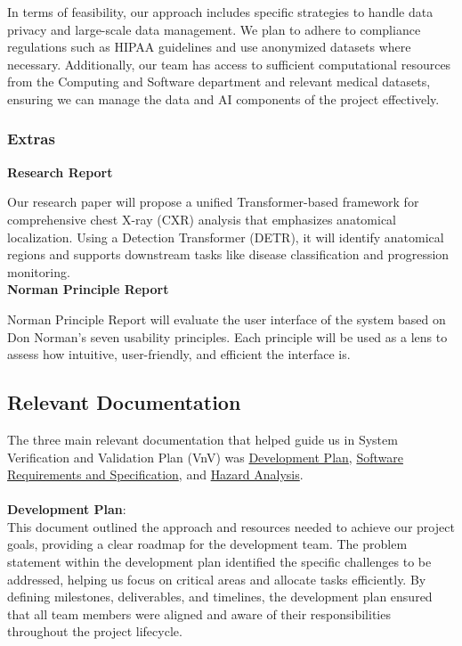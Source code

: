 \documentclass[12pt, titlepage]{article}
\begin{document}
\noindent In terms of feasibility, our approach includes specific strategies to handle data privacy and large-scale data management. We plan to adhere to compliance regulations such as HIPAA guidelines and use anonymized datasets where necessary. Additionally, our team has access to sufficient computational resources from the Computing and Software department and relevant medical datasets, ensuring we can manage the data and AI components of the project effectively.

\subsubsection{Extras}

\noindent \textbf{Research Report}

\noindent Our research paper will propose a unified Transformer-based framework for comprehensive chest X-ray (CXR) analysis that emphasizes anatomical localization. Using a Detection Transformer (DETR), it will identify anatomical regions and supports downstream tasks like disease classification and progression monitoring. \\

\noindent \textbf{Norman Principle Report}

\noindent Norman Principle Report will evaluate the user interface of the system based on Don Norman's seven usability principles. Each principle will be used as a lens to assess how intuitive, user-friendly, and efficient the interface is.\\

\subsection{Relevant Documentation}

The three main relevant documentation that helped guide us in System Verification and Validation Plan (VnV) was \href{https://github.com/RezaJodeiri/CXR-Capstone/blob/main/docs/DevelopmentPlan/DevelopmentPlan.pdf}{Development Plan}, \href{https://github.com/RezaJodeiri/CXR-Capstone/blob/main/docs/SRS/SRS.pdf}{Software Requirements and Specification}, and 
\href{https://github.com/RezaJodeiri/CXR-Capstone/blob/main/docs/HazardAnalysis/HazardAnalysis.pdf}{Hazard Analysis}.
\\\\
\textbf{Development Plan}:\\

\noindent This document outlined the approach and resources needed to achieve our project goals, providing a clear roadmap for the development team. The problem statement within the development plan identified the specific challenges to be addressed, helping us focus on critical areas and allocate tasks efficiently. By defining milestones, deliverables, and timelines, the development plan ensured that all team members were aligned and aware of their responsibilities throughout the project lifecycle.\\
\end{document}
